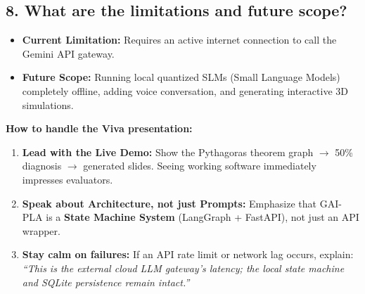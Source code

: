 \documentclass[11pt,a4paper]{article}
\begin{document}
\subsection*{8. What are the limitations and future scope?}
\begin{answerbox}
\begin{itemize}[noitemsep]
    \item \textbf{Current Limitation:} Requires an active internet connection to call the Gemini API gateway.
    \item \textbf{Future Scope:} Running local quantized SLMs (Small Language Models) completely offline, adding voice conversation, and generating interactive 3D simulations.
\end{itemize}
\end{answerbox}

\vspace{0.4cm}
\begin{tipbox}
\textbf{How to handle the Viva presentation:}
\begin{enumerate}[noitemsep]
    \item \textbf{Lead with the Live Demo:} Show the Pythagoras theorem graph $\to$ 50\% diagnosis $\to$ generated slides. Seeing working software immediately impresses evaluators.
    \item \textbf{Speak about Architecture, not just Prompts:} Emphasize that GAI-PLA is a \textbf{State Machine System} (LangGraph + FastAPI), not just an API wrapper.
    \item \textbf{Stay calm on failures:} If an API rate limit or network lag occurs, explain: \textit{``This is the external cloud LLM gateway's latency; the local state machine and SQLite persistence remain intact.''}
\end{enumerate}
\end{tipbox}
\end{document}
